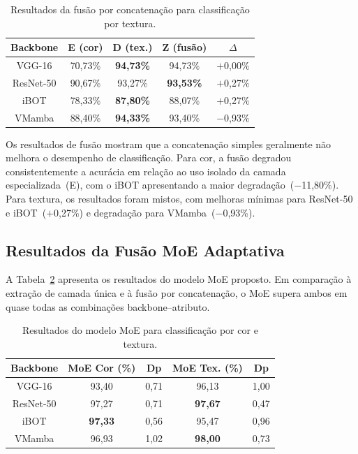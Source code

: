 \documentclass[conference]{IEEEtran}
\begin{document}
\begin{table}[htbp]
\caption{Resultados da fusão por concatenação para classificação por
         textura.}
\begin{center}
\begin{tabular}{c|c|c|c|c}
\hline
\textbf{Backbone} & \textbf{E (cor)} & \textbf{D (tex.)}
                  & \textbf{Z (fusão)} & \textbf{$\Delta$} \\
\hline
VGG-16    & 70,73\% & \textbf{94,73\%} & 94,73\% & $+$0,00\% \\
ResNet-50 & 90,67\% & 93,27\%          & \textbf{93,53\%} & $+$0,27\% \\
iBOT      & 78,33\% & \textbf{87,80\%} & 88,07\% & $+$0,27\% \\
VMamba    & 88,40\% & \textbf{94,33\%} & 93,40\% & $-$0,93\% \\
\hline
\end{tabular}
\label{tab7}
\end{center}
\end{table}

Os resultados de fusão mostram que a concatenação simples geralmente não
melhora o desempenho de classificação.
Para cor, a fusão degradou consistentemente a acurácia em relação ao uso
isolado da camada especializada~(E), com o iBOT apresentando a maior
degradação~($-$11,80\%).
Para textura, os resultados foram mistos, com melhoras mínimas para
ResNet-50 e iBOT~($+$0,27\%) e degradação para VMamba~($-$0,93\%).

\subsection{Resultados da Fusão MoE Adaptativa}

A Tabela~\ref{tab_moe} apresenta os resultados do modelo MoE proposto.
Em comparação à extração de camada única e à fusão por concatenação, o
MoE supera ambos em quase todas as combinações backbone–atributo.

\begin{table}[htbp]
\caption{Resultados do modelo MoE para classificação por cor e textura.}
\begin{center}
\begin{tabular}{c|c|c|c|c}
\hline
\textbf{Backbone} & \textbf{MoE Cor (\%)} & \textbf{Dp}
                  & \textbf{MoE Tex. (\%)} & \textbf{Dp} \\
\hline
VGG-16    & 93,40 & 0,71 & 96,13 & 1,00 \\
ResNet-50 & 97,27 & 0,71 & \textbf{97,67} & 0,47 \\
iBOT      & \textbf{97,33} & 0,56 & 95,47 & 0,96 \\
VMamba    & 96,93 & 1,02 & \textbf{98,00} & 0,73 \\
\hline
\end{tabular}
\label{tab_moe}
\end{center}
\end{table}
\end{document}
